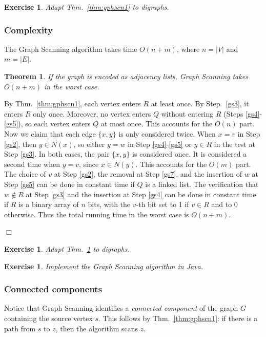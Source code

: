\documentclass[a4paper]{book}
\theoremstyle{changebreak}                %
\newtheorem{thm}[result]{Theorem}
\newtheorem{ex}[result]{Exercise}
\newenvironment{proof}
 {{\sl Proof.}\hspace*{1 ex}}%
 {{\nopagebreak\hspace*{\fill}$\Box$\par\vspace{12pt}}}
\begin{document}
\begin{ex}
Adapt Thm.~\ref{thm:gphscn1} to digraphs.
\end{ex}

\subsubsection{Complexity}
The {\sc Graph Scanning} algorithm takes time $O(n+m)$, where $n=|V|$
and $m=|E|$.

\begin{thm}
If the graph is encoded as adjacency lists, {\sc
  Graph Scanning} takes $O(n+m)$ in the worst case.
\label{thm:gphscn2}
\end{thm}
\begin{proof}
By Thm.~\ref{thm:gphscn1}, each vertex enters $R$ at least once. By
Step.~\ref{gs3}, it enters $R$ only once. Moreover, no vertex enters
$Q$ without entering $R$ (Steps \ref{gs4}-\ref{gs5}), so each vertex
enters $Q$ at most once. This accounts for the $O(n)$ part. Now we
claim that each edge $\{x,y\}$ is only considered twice. When $x=v$ in
Step \ref{gs2}, then $y\in N(x)$, so either $y=w$ in Step
\ref{gs4}-\ref{gs5} or $y\in R$ in the test at Step \ref{gs3}. In both
cases, the pair $\{x,y\}$ is considered once. It is considered a
second time when $y=v$, since $x\in N(y)$. This accounts for the
$O(m)$ part. The choice of $v$ at Step \ref{gs2}, the removal at Step
\ref{gs7}, and the insertion of $w$ at Step \ref{gs5} can be done in
constant time if $Q$ is a linked list. The
verification that $w\not\in R$ at Step \ref{gs3} and the insertion at
Step \ref{gs4} can be done in constant time if $R$ is a binary
array of $n$ bits, with the $v$-th bit
set to 1 if $v\in R$ and to 0 otherwise. Thus the total running time
in the worst case is $O(n+m)$.
\end{proof}

\begin{ex}
Adapt Thm.~\ref{thm:gphscn2} to digraphs.
\end{ex}

\begin{ex}
Implement the {\sc Graph Scanning} algorithm in Java.
\end{ex}

\subsubsection{Connected components}
Notice that {\sc Graph Scanning} identifies a {\it connected
  component} of the graph $G$ containing
the source vertex $s$. This follows by
Thm.~\ref{thm:gphscn1}: if there is a path from $s$ to $z$, then the
algorithm scans $z$. 
\end{document}
